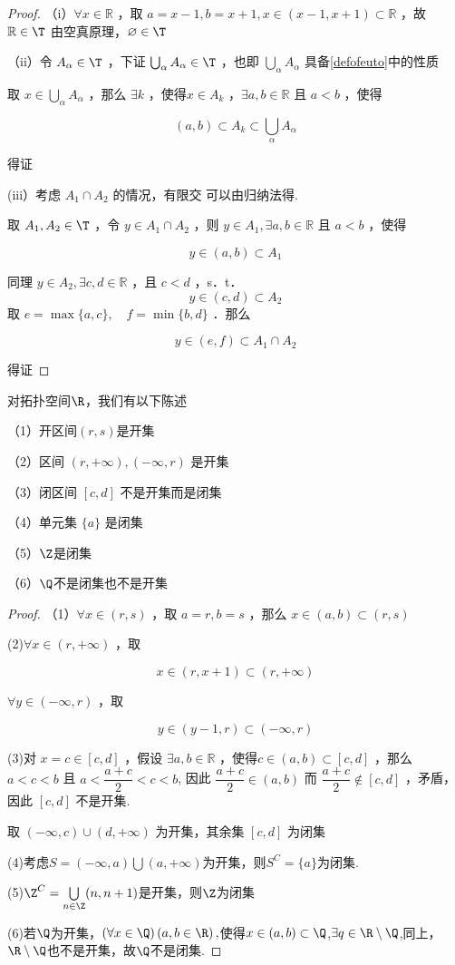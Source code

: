\begin{proof}
	（i）$\forall x \in \mathbb{R}$ ，取 $a=x-1, b=x+1,  x \in\left(x-1,  x+1\right)\subset \mathbb{R}$ ，故 $\mathbb{R} \in \T$
	由空真原理，$\varnothing \in \T$
	
	（ii）令 $A_\alpha \in \T$ ，下证 $\bigcup_\alpha A_\alpha \in \T$ ，也即 $\bigcup_\alpha A_\alpha$ 具备\ref{defofeuto}中的性质
	
	取 $x \in \bigcup_\alpha A_\alpha$ ，那么 $\exists k$ ，使得$x \in A_k$ ，$\exists a, b \in \mathbb{R}$ 且 $a<b$ ，使得
	
	$$
	(a, b) \subset A_k \subset \bigcup_\alpha A_\alpha
	$$
	
	
	得证
	
	(iii）考虑 $A_1 \cap A_2$ 的情况，有限交 可以由归纳法得.
	
	取 $A_1, A_2 \in \T$ ，令 $y \in A_1 \cap A_2$ ，则 $y \in A_1, \exists a, b \in \mathbb{R}$ 且 $a<b$ ，使得
	
	$$
	y \in(a, b) \subset A_1
	$$
	
	
	同理 $y \in A_2, \exists c, d \in \mathbb{R}$ ，且 $c<d$ ，s．t．
	$$y \in(c, d) \subset A_2$$
	取 $e=\max \{a, c\}, \quad f=\min \{b, d\}$ ．那么
	
	$$
	y \in(e, f) \subset A_1 \cap A_2
	$$
	
	
	得证
\end{proof}
\begin{proposition}
	对拓扑空间$\R$，我们有以下陈述
	
	（1）开区间$\left(r,s\right)$是开集
	
	（2）区间 $(r,+\infty),(-\infty, r)$ 是开集
	
	（3）闭区间 $[c, d]$ 不是开集而是闭集
	
	（4）单元集 $\{a\}$ 是闭集
	
	（5）$\Z$是闭集
	
	（6）$\Q$不是闭集也不是开集
\end{proposition}
\begin{proof}
	（1）$\forall x \in(r, s)$ ，取 $a=r, b=s$ ，那么 $x \in(a, b) \subset(r, s)$
	
	(2)$\forall x \in(r,+\infty)$ ，取
	
	$$
	x \in(r, x+1) \subset(r,+\infty)
	$$
	
	$\forall y \in(-\infty, r)$ ，取
	
	$$
	y \in(y-1, r) \subset(-\infty, r)
	$$
	
	
	(3)对 $x=c \in[c, d]$ ，假设 $\exists a, b \in \mathbb{R}$ ，使得$c \in(a, b) \subset[c, d]$ ，那么 $a<c<b$ 且 $a<\dfrac{a+c}{2}<c<b$,
	因此 $ \dfrac{a+c}{2} \in(a, b)$ 而 $\dfrac{a+c}{2} \notin[c, d]$ ，矛盾，因此 $[c, d]$ 不是开集.
	
	取 $(-\infty, c) \cup(d,+\infty)$ 为开集，其余集 $[c, d]$ 为闭集
	
	
	(4)考虑$S=\left(-\infty,a\right)\bigcup\left(a,+\infty\right)$为开集，则$S^C=\{a\}$为闭集.
	
	(5)$\Z^C=\bigcup\limits_{n\in\Z}(n,n+1)$是开集，则$\Z$为闭集
	
	(6)若$\Q$为开集，$\left(\forall x\in\Q\right)\left(a,b\in\R\right),$使得$x\in\left(a,b\right)\subset\Q$,$\exists q\in\R\setminus\Q$,同上，$\R\setminus\Q$也不是开集，故$\Q$不是闭集.
\end{proof}
